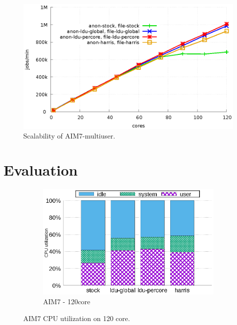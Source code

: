 

\begin{figure}[tb]
  \begin{center}
    \includegraphics[scale=0.8]{graph/aim7.eps}
  \end{center}
  \caption{Scalability of AIM7-multiuser.}
  \label{fig:aim7}
\end{figure}

\section{Evaluation}
\label{sec:evaluation}


\begin{figure}[tb]
    \centering
    \begin{subfigure}[b]{1\textwidth}
  \begin{center}
        \includegraphics[scale=0.8]{graph/aim7_cpuutils.eps}
        \caption{AIM7 - 120core}
  \end{center}
    \end{subfigure}%
    \centering
    \caption{AIM7 CPU utilization on 120 core.}
    \label{fig:utilization_aim7}
    
\end{figure}


